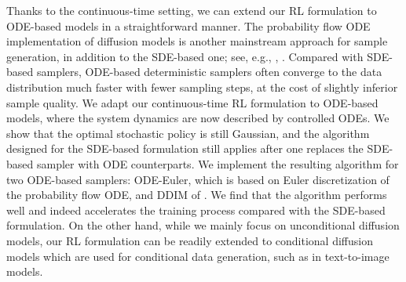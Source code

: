 \documentclass[11pt]{article}
\begin{document}
Thanks to the continuous-time setting, we can extend our RL formulation to ODE-based models in a straightforward manner. The probability flow ODE implementation of diffusion models is another mainstream approach for sample generation, in addition to the SDE-based one; see, e.g., \cite{song2020denoising}, \cite{SongICLR2021, Karras2022, lu2022dpm}. Compared with SDE-based samplers,  ODE-based deterministic samplers often converge to the data distribution much faster with fewer sampling steps, at the cost of slightly inferior sample quality.
We adapt our continuous-time RL formulation to ODE-based models, where the system dynamics are now described by controlled ODEs. We show that the optimal stochastic policy is still Gaussian, and the algorithm designed for the SDE-based formulation still applies after one replaces the SDE-based sampler with ODE counterparts. We implement the resulting algorithm for two ODE-based samplers: ODE-Euler, which is based on Euler discretization of the probability flow ODE, and DDIM of \cite{song2020denoising}. We find that the algorithm performs well and indeed accelerates the training process compared with the SDE-based formulation. On the other hand, while we mainly focus on unconditional diffusion models, our RL formulation can be readily extended to conditional diffusion models which are used for conditional data generation, such as in text-to-image models.
\end{document}
